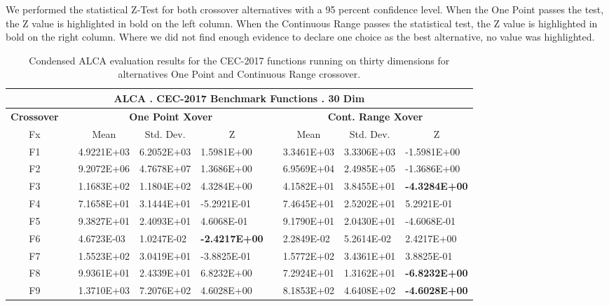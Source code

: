 \documentclass[graybox]{svmult}
\begin{document}
    \FloatBarrier

    We performed the statistical Z-Test for both crossover alternatives with a 95 percent confidence level. When the One Point passes the test, the Z value is highlighted in bold on the left column. When the Continuous Range passes the statistical test, the Z value is highlighted in bold on the right column. Where we did not find enough evidence to declare one choice as the best alternative, no value was highlighted.


    \begin{table}[]
    \scriptsize
    \centering
    \caption{Condensed ALCA evaluation results for the CEC-2017 functions running on thirty dimensions for alternatives One Point and Continuous Range crossover.}\label{tab.condensed_evaluation_30D}
    \begin{tabular}{@{}cllllllll@{}}
    \toprule
    \multicolumn{9}{c}{\textbf{ALCA   . CEC-2017 Benchmark Functions . 30 Dim}} \\ \midrule
    \textbf{Crossover} & \textbf{} & \multicolumn{3}{c}{\textbf{One Point   Xover}} & \multicolumn{1}{c}{\textbf{}} & \multicolumn{3}{c}{\textbf{Cont. Range   Xover}} \\
    Fx &  & \multicolumn{1}{c}{Mean} & \multicolumn{1}{c}{Std. Dev.} & \multicolumn{1}{c}{Z} & \multicolumn{1}{c}{} & \multicolumn{1}{c}{Mean} & \multicolumn{1}{c}{Std. Dev.} & \multicolumn{1}{c}{Z} \\
    F1 &  & 4.9221E+03 & 6.2052E+03 & 1.5981E+00 &  & 3.3461E+03 & 3.3306E+03 & -1.5981E+00 \\
    F2 &  & 9.2072E+06 & 4.7678E+07 & 1.3686E+00 &  & 6.9569E+04 & 2.4985E+05 & -1.3686E+00 \\
    F3 &  & 1.1683E+02 & 1.1804E+02 & 4.3284E+00 &  & 4.1582E+01 & 3.8455E+01 & \textbf{-4.3284E+00} \\
    F4 &  & 7.1658E+01 & 3.1444E+01 & -5.2921E-01 &  & 7.4645E+01 & 2.5202E+01 & 5.2921E-01 \\
    F5 &  & 9.3827E+01 & 2.4093E+01 & 4.6068E-01 &  & 9.1790E+01 & 2.0430E+01 & -4.6068E-01 \\
    F6 &  & 4.6723E-03 & 1.0247E-02 & \textbf{-2.4217E+00} &  & 2.2849E-02 & 5.2614E-02 & 2.4217E+00 \\
    F7 &  & 1.5523E+02 & 3.0419E+01 & -3.8825E-01 &  & 1.5772E+02 & 3.4361E+01 & 3.8825E-01 \\
    F8 &  & 9.9361E+01 & 2.4339E+01 & 6.8232E+00 &  & 7.2924E+01 & 1.3162E+01 & \textbf{-6.8232E+00} \\
    F9 &  & 1.3710E+03 & 7.2076E+02 & 4.6028E+00 &  & 8.1853E+02 & 4.6408E+02 & \textbf{-4.6028E+00} \\

\end{tabular}
\end{table}
\end{document}
